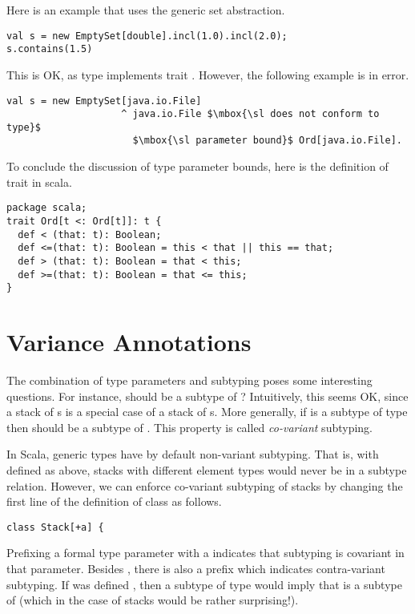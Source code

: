 Here is an example that uses the generic set abstraction.
\begin{lstlisting}
val s = new EmptySet[double].incl(1.0).incl(2.0);
s.contains(1.5)
\end{lstlisting}
This is OK, as type  implements trait .
However, the following example is in error.
\begin{lstlisting}
val s = new EmptySet[java.io.File]
                    ^ java.io.File $\mbox{\sl does not conform to type}$
                      $\mbox{\sl parameter bound}$ Ord[java.io.File].
\end{lstlisting}
To conclude the discussion of type parameter
bounds, here is the definition of trait  in scala.
\begin{lstlisting}
package scala;
trait Ord[t <: Ord[t]]: t {
  def < (that: t): Boolean;
  def <=(that: t): Boolean = this < that || this == that;
  def > (that: t): Boolean = that < this;
  def >=(that: t): Boolean = that <= this;
}
\end{lstlisting}

\section{Variance Annotations}\label{sec:first-arrays}

The combination of type parameters and subtyping poses some
interesting questions. For instance, should  be a
subtype of ? Intuitively, this seems OK, since a
stack of s is a special case of a stack of
s.  More generally, if  is a subtype of type 
then  should be a subtype of . 
This property is called {\em co-variant} subtyping.

In Scala, generic types have by default non-variant subtyping. That
is, with  defined as above, stacks with different element
types would never be in a subtype relation. However, we can enforce
co-variant subtyping of stacks by changing the first line of the
definition of class  as follows.
\begin{lstlisting}
class Stack[+a] {
\end{lstlisting}
Prefixing a formal type parameter with a \code{+} indicates that
subtyping is covariant in that parameter. 
Besides \code{+}, there is also a prefix \code{-} which indicates
contra-variant subtyping. If  was defined , then  a subtype of type  would imply
that  is a subtype of  (which in the
case of stacks would be rather surprising!).

